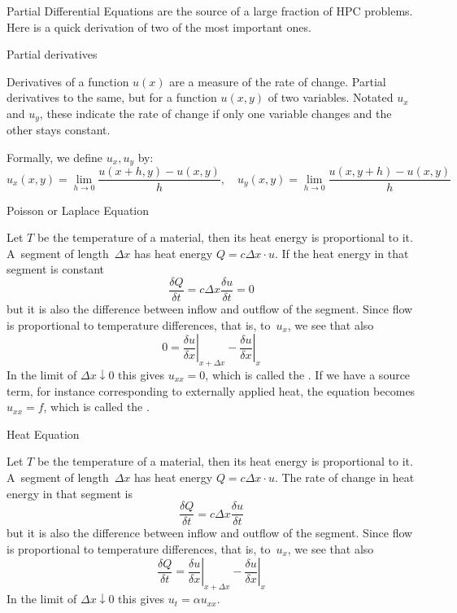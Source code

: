 
Partial Differential Equations
are the source of a large fraction of \ac{HPC} problems. Here is a
quick derivation of two of the most important ones.

 {Partial derivatives}

Derivatives of a function $u(x)$ are a measure of the rate of
change. Partial derivatives to the same, but for a function $u(x,y)$
of two variables. Notated $u_x$ and $u_y$, these  indicate the rate of change if only one variable changes
and the other stays constant.

Formally, we define
$u_x,u_y$ by:
\[ u_x(x,y) = \lim_{h\rightarrow0}\frac{u(x+h,y)-u(x,y)}h,\quad
   u_y(x,y) = \lim_{h\rightarrow0}\frac{u(x,y+h)-u(x,y)}h
\]

 {Poisson or Laplace Equation}

Let $T$ be the temperature of a material, then its heat energy is
proportional to it. A~segment of length~$\Delta x$ has heat energy
$Q=c\Delta x\cdot u$. If the heat energy in that
segment is constant
\[ \frac{\delta Q}{\delta t}=c\Delta x\frac{\delta u}{\delta t}=0 \]
but it is also the difference between inflow and outflow of the
segment. Since flow is proportional to temperature differences, that
is, to~$u_x$, we see that also
\[ 0=
    \left.\frac{\delta u}{\delta x}\right|_{x+\Delta x}-
    \left.\frac{\delta u}{\delta x}\right|_{x}
\]
In the limit of $\Delta x\downarrow0$ this gives $u_{xx}=0$, which is
called the . If we have a source term, for
instance corresponding to externally applied heat, the equation
becomes $u_{xx}=f$, which is called the .

 {Heat Equation}

Let $T$ be the temperature of a material, then its heat energy is
proportional to it. A~segment of length~$\Delta x$ has heat energy
$Q=c\Delta x\cdot u$. The rate of change in heat energy in that
segment is
\[ \frac{\delta Q}{\delta t}=c\Delta x\frac{\delta u}{\delta t} \]
but it is also the difference between inflow and outflow of the
segment. Since flow is proportional to temperature differences, that
is, to~$u_x$, we see that also
\[ \frac{\delta Q}{\delta t}=
    \left.\frac{\delta u}{\delta x}\right|_{x+\Delta x}-
    \left.\frac{\delta u}{\delta x}\right|_{x}
\]
In the limit of $\Delta x\downarrow0$ this gives $u_t=\alpha u_{xx}$.


